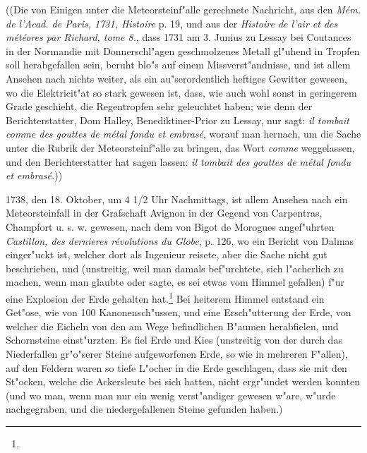 \documentclass[a4paper, 11pt, oneside, polutonikogreek, german]{article}
\begin{document}
((Die von Einigen unter die Meteorsteinf"alle gerechnete Nachricht, aus den \emph{Mém. de l'Acad. de Paris, 1731, Histoire} p. 19, und aus der \emph{Histoire de l'air et des météores par Richard, tome 8.}, dass 1731 am 3. Junius zu Lessay bei Coutances in der Normandie mit Donnerschl"agen geschmolzenes Metall gl"uhend in Tropfen soll herabgefallen sein, beruht blo"s auf einem Missverst"andnisse, und ist allem Ansehen nach nichts weiter, als ein au"serordentlich heftiges Gewitter gewesen, wo die Elektricit"at so stark gewesen ist, dass, wie auch wohl sonst in geringerem Grade geschieht, die Regentropfen sehr geleuchtet haben; wie denn der Berichterstatter, Dom Halley, Benediktiner-Prior zu Lessay, nur sagt: \emph{il tombait comme des gouttes de métal fondu et embrasé}, worauf man hernach, um die Sache unter die Rubrik der Meteorsteinf"alle zu bringen, das Wort \emph{comme} weggelassen, und den Berichterstatter hat sagen lassen: \emph{il tombait des gouttes de métal fondu et embrasé.}))

1738, den 18. Oktober, um 4 1/2 Uhr Nachmittags, ist allem Ansehen nach ein Meteorsteinfall in der Grafschaft Avignon in der Gegend von Carpentras, Champfort u. s. w. gewesen, nach dem von Bigot de Morogues angef"uhrten \emph{Castillon, des dernieres révolutions du Globe}, p. 126, wo ein Bericht von Dalmas einger"uckt ist, welcher dort als Ingenieur reisete, aber die Sache nicht gut beschrieben, und (unstreitig, weil man damals bef"urchtete, sich l"acherlich zu machen, wenn man glaubte oder sagte, es sei etwas vom Himmel gefallen) f"ur eine Explosion der Erde gehalten hat.\footnote{} Bei heiterem Himmel entstand ein Get"ose, wie von 100 Kanonensch"ussen, und eine Ersch"utterung der Erde, von welcher die Eicheln von den am Wege befindlichen B"aumen herabfielen, und Schornsteine einst"urzten. Es fiel Erde und Kies (unstreitig von der durch das Niederfallen gr"o"serer Steine aufgeworfenen Erde, so wie in mehreren F"allen), auf den Feldern waren so tiefe L"ocher in die Erde geschlagen, dass sie mit den St"ocken, welche die Ackersleute bei sich hatten, nicht ergr"undet werden konnten (und wo man, wenn man nur ein wenig verst"andiger gewesen w"are, w"urde nachgegraben, und die niedergefallenen Steine gefunden haben.)
\end{document}
